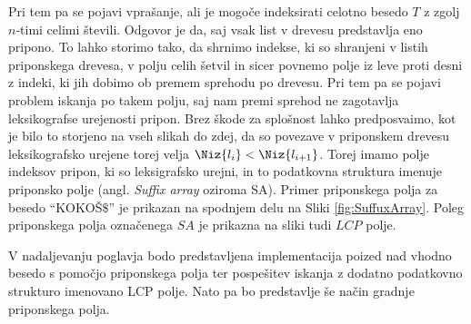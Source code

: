 Pri tem pa se pojavi vprašanje, ali je mogoče indeksirati celotno besedo $T$ z zgolj $n$-timi celimi števili. Odgovor je da, saj vsak list v drevesu predstavlja eno pripono. To lahko storimo tako, da shrnimo indekse, ki so shranjeni v listih priponskega drevesa, v polju celih šetvil in sicer povnemo polje iz leve proti desni z indeki, ki jih dobimo ob premem sprehodu po drevesu. Pri tem pa se pojavi problem iskanja po takem polju, saj nam premi sprehod ne zagotavlja leksikografse urejenosti pripon. Brez škode za splošnost lahko predposvaimo, kot je bilo to storjeno na vseh slikah do zdej, da so povezave v priponskem drevesu leksikografsko urejene torej velja $\Niz{l_i}<\Niz{l_{i+1}}$. Torej imamo polje indeksov pripon, ki so leksigrafsko urejni, in to podatkovna struktura imenuje priponsko polje (angl. \textit{Suffix array} oziroma SA). Primer priponskega polja za besedo \enquote{KOKOŠ$\$$} je prikazan na spodnjem delu na Sliki \ref{fig:SuffuxArray}. Poleg priponskega polja označenega $SA$ je prikazna na sliki tudi $LCP$ polje.



V nadaljevanju poglavja bodo predstavljena implementacija poized nad vhodno besedo s pomočjo priponskega polja ter pospešitev iskanja z dodatno podatkovno strukturo imenovano LCP polje. Nato pa bo predstavlje še način gradnje priponskega polja. %




